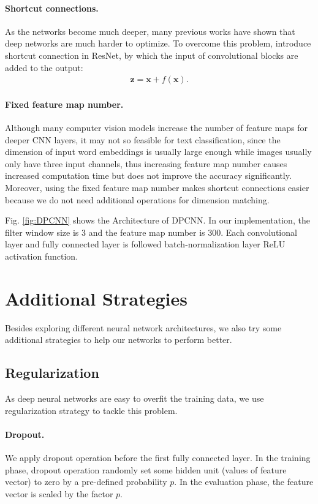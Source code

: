 \documentclass[11pt,letterpaper]{article}
\begin{document}
    \paragraph{Shortcut connections.} As the networks become much deeper, many
    previous works have shown that deep networks are much harder to optimize.
    To overcome this problem,  introduce shortcut connection
    in ResNet, by which the input of convolutional blocks are added to the 
    output:
    \begin{align}
        \mathbf{z} = \mathbf{x} + f(\mathbf{x}).
    \end{align}

    \paragraph{Fixed feature map number.} Although many computer vision models
    increase the number of feature maps for deeper CNN layers, it may not so
    feasible for text classification, since the dimension of input word 
    embeddings is usually large enough while images usually only have three 
    input channels, thus increasing feature map number causes increased 
    computation time but does not improve the accuracy significantly. Moreover,
    using the fixed feature map number makes shortcut connections easier because 
    we do not need additional operations for dimension matching. 

    Fig. \ref{fig:DPCNN} shows the Architecture of DPCNN. In our implementation,
    the filter window size is 3 and the feature map number is 300. Each 
    convolutional layer and fully connected layer is followed 
    batch-normalization layer ReLU activation function.

\section{Additional Strategies}
    Besides exploring different neural network architectures, we also try some
    additional strategies to help our networks to perform better.

\subsection{Regularization}
    As deep neural networks are easy to overfit the training data, we use 
    regularization strategy to tackle this problem.

    \paragraph{Dropout.} We apply dropout \cite{hinton2012improving} operation 
    before the first fully connected layer. In the training phase, dropout 
    operation randomly set some hidden unit (values of feature vector) to zero 
    by a pre-defined probability $p$. In the evaluation phase, the feature 
    vector is scaled by the factor $p$.
\end{document}
